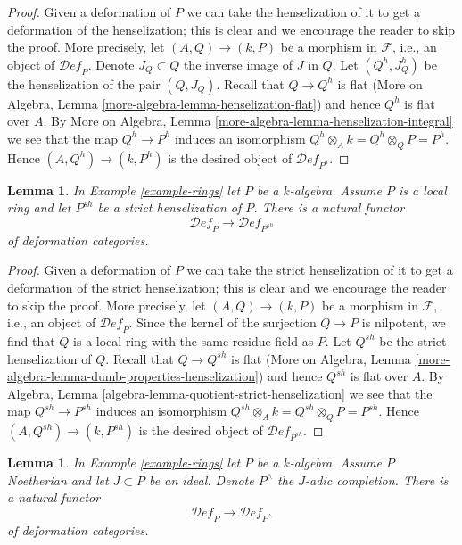 \documentclass{stacks-project}
\theoremstyle{plain}
\newtheorem{lemma}[subsection]{Lemma}
\theoremstyle{definition}
\theoremstyle{remark}
\numberwithin{equation}{subsection}
\def\Deformationcategory{\mathcal{D}\!\mathit{ef}}
\begin{document}
\begin{proof}
Given a deformation of $P$ we can take the henselization
of it to get a deformation of the henselization; this is
clear and we encourage the reader to skip the proof. More precisely,
let $(A, Q) \to (k, P)$ be a morphism in $\mathcal{F}$, i.e.,
an object of $\Deformationcategory_P$. Denote $J_Q \subset Q$ the inverse
image of $J$ in $Q$. Let $(Q^h, J_Q^h)$ be the henselization of
the pair $(Q, J_Q)$. Recall that $Q \to Q^h$ is flat
(More on Algebra, Lemma \ref{more-algebra-lemma-henselization-flat})
and hence $Q^h$ is flat over $A$.
By More on Algebra, Lemma \ref{more-algebra-lemma-henselization-integral}
we see that the map $Q^h \to P^h$ induces an isomorphism
$Q^h \otimes_A k = Q^h \otimes_Q P = P^h$.
Hence $(A, Q^h) \to (k, P^h)$ is the desired object of
$\Deformationcategory_{P^h}$.
\end{proof}

\begin{lemma}
\label{lemma-strict-henselization}
In Example \ref{example-rings} let $P$ be a $k$-algebra.
Assume $P$ is a local ring and let $P^{sh}$ be a strict henselization of $P$.
There is a natural functor
$$
\Deformationcategory_P \longrightarrow \Deformationcategory_{P^{sh}}
$$
of deformation categories.
\end{lemma}

\begin{proof}
Given a deformation of $P$ we can take the strict henselization
of it to get a deformation of the strict henselization; this is
clear and we encourage the reader to skip the proof. More precisely,
let $(A, Q) \to (k, P)$ be a morphism in $\mathcal{F}$, i.e.,
an object of $\Deformationcategory_P$. Since the kernel of the surjection
$Q \to P$ is nilpotent, we find that $Q$ is a local ring with the
same residue field as $P$. Let $Q^{sh}$ be the strict henselization
of $Q$. Recall that $Q \to Q^{sh}$ is flat
(More on Algebra, Lemma \ref{more-algebra-lemma-dumb-properties-henselization})
and hence $Q^{sh}$ is flat over $A$.
By Algebra, Lemma \ref{algebra-lemma-quotient-strict-henselization}
we see that the map $Q^{sh} \to P^{sh}$ induces an isomorphism
$Q^{sh} \otimes_A k = Q^{sh} \otimes_Q P = P^{sh}$.
Hence $(A, Q^{sh}) \to (k, P^{sh})$ is the desired object of
$\Deformationcategory_{P^{sh}}$.
\end{proof}

\begin{lemma}
\label{lemma-completion}
In Example \ref{example-rings} let $P$ be a $k$-algebra.
Assume $P$ Noetherian and let $J \subset P$ be an ideal.
Denote $P^\wedge$ the $J$-adic completion.
There is a natural functor
$$
\Deformationcategory_P \longrightarrow \Deformationcategory_{P^\wedge}
$$
of deformation categories.
\end{lemma}
\end{document}

